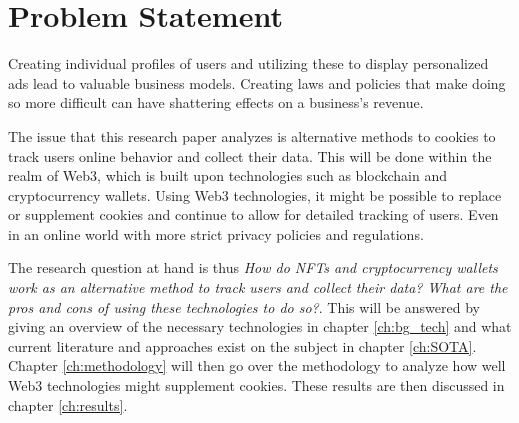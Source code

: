 \chapter{Problem Statement}
\label{ch:problem}

Creating individual profiles of users and utilizing these to display personalized ads lead to valuable business models. Creating laws and policies that make doing so more difficult can have shattering effects on a business's revenue.

The issue that this research paper analyzes is alternative methods to cookies to track users online behavior and collect their data. This will be done within the realm of Web3, which is built upon technologies such as blockchain and cryptocurrency wallets. Using Web3 technologies, it might be possible to replace or supplement cookies and continue to allow for detailed tracking of users. Even in an online world with more strict privacy policies and regulations.

The research question at hand is thus \textit{How do NFTs and cryptocurrency wallets work as an alternative method to track users and collect their data? What are the pros and cons of using these technologies to do so?}. This will be answered by giving an overview of the necessary technologies in chapter \ref{ch:bg_tech} and what current literature and approaches exist on the subject in chapter \ref{ch:SOTA}. Chapter \ref{ch:methodology} will then go over the methodology to analyze how well Web3 technologies might supplement cookies. These results are then discussed in chapter \ref{ch:results}.